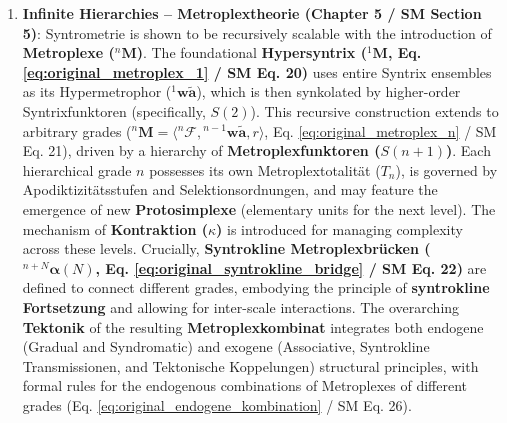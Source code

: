 \documentclass[12pt]{article}
\newcommand{\metroplex}[1]{{}^{#1}\mathbf{M}}
\newcommand{\hypersyntrix}{\metroplex{1}}
\newcommand{\hypermetrophor}[1]{{}^{#1}\mathbf{w\widetilde{a}}}
\newcommand{\metroplexsynkolator}[1]{{}^{#1}\mathcal{F}}
\newcommand{\metroplexfunktor}{S}
\newcommand{\syntroklinebruecke}[1]{{}^{#1}\bm{\alpha}}
\newcommand{\metroplextotalitaetarg}[1]{T_{#1}}
\begin{document}
\begin{enumerate}
    \item \textbf{Infinite Hierarchies – Metroplextheorie (Chapter 5 / SM Section 5)}: Syntrometrie is shown to be recursively scalable with the introduction of \textbf{Metroplexe (\( \metroplex{n} \))}. The foundational \textbf{Hypersyntrix (\( \hypersyntrix \), Eq. \eqref{eq:original_metroplex_1} / SM Eq. 20)} uses entire Syntrix ensembles as its Hypermetrophor (\( \hypermetrophor{1} \)), which is then synkolated by higher-order Syntrixfunktoren (specifically, \( \metroplexfunktor(2) \)). This recursive construction extends to arbitrary grades (\( \metroplex{n} = \langle \metroplexsynkolator{n}, \hypermetrophor{n-1}, r \rangle \), Eq. \eqref{eq:original_metroplex_n} / SM Eq. 21), driven by a hierarchy of \textbf{Metroplexfunktoren (\( \metroplexfunktor(n+1) \))}. Each hierarchical grade \(n\) possesses its own Metroplextotalität (\( \metroplextotalitaetarg{n} \)), is governed by Apodiktizitätsstufen and Selektionsordnungen, and may feature the emergence of new \textbf{Protosimplexe} (elementary units for the next level). The mechanism of \textbf{Kontraktion (\( \kappa \))} is introduced for managing complexity across these levels. Crucially, \textbf{Syntrokline Metroplexbrücken (\( \syntroklinebruecke{n+N}(N) \), Eq. \eqref{eq:original_syntrokline_bridge} / SM Eq. 22)} are defined to connect different grades, embodying the principle of \textbf{syntrokline Fortsetzung} and allowing for inter-scale interactions. The overarching \textbf{Tektonik} of the resulting \textbf{Metroplexkombinat} integrates both endogene (Gradual and Syndromatic) and exogene (Associative, Syntrokline Transmissionen, and Tektonische Koppelungen) structural principles, with formal rules for the endogenous combinations of Metroplexes of different grades (Eq. \eqref{eq:original_endogene_kombination} / SM Eq. 26).


\end{enumerate}
\end{document}
